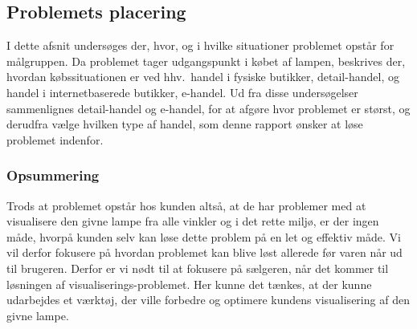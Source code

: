\subsection{Problemets placering}
I dette afsnit undersøges der, hvor, og i hvilke situationer problemet opstår for målgruppen. Da problemet tager udgangspunkt i købet af lampen, beskrives der, hvordan købssituationen er ved hhv.\ handel i fysiske butikker, detail-handel, og handel i internetbaserede butikker, e-handel. Ud fra disse undersøgelser sammenlignes detail-handel og e-handel, for at afgøre hvor problemet er størst, og derudfra vælge hvilken type af handel, som denne rapport ønsker at løse problemet indenfor.







\subsubsection*{Opsummering}
Trods at problemet opstår hos kunden altså, at de har problemer med at visualisere den givne lampe fra alle vinkler og i det rette miljø, er der ingen måde, hvorpå kunden selv kan løse dette problem på en let og effektiv måde. Vi vil derfor fokusere på hvordan problemet kan blive løst allerede før varen når ud til brugeren. Derfor er vi nødt til at fokusere på sælgeren, når det kommer til løsningen af visualiserings-problemet. Her kunne det tænkes, at der kunne udarbejdes et værktøj, der ville forbedre og optimere kundens visualisering af den givne lampe.

